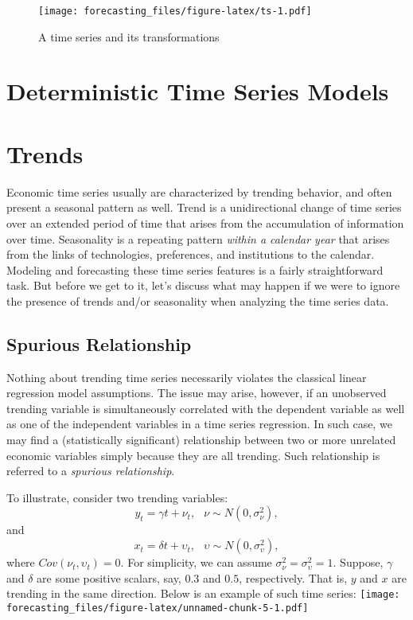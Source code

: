 \documentclass[
  oneside]{book}
\begin{document}
\begin{figure}
\centering
\texttt{[image: forecasting\_files/figure-latex/ts-1.pdf]}
\caption{\label{fig:ts}A time series and its transformations}
\end{figure}

\hypertarget{deterministic-time-series-models}{%
\chapter*{Deterministic Time Series Models}\label{deterministic-time-series-models}}

\hypertarget{trends}{%
\chapter{Trends}\label{trends}}

Economic time series usually are characterized by trending behavior, and often present a seasonal pattern as well. Trend is a unidirectional change of time series over an extended period of time that arises from the accumulation of information over time. Seasonality is a repeating pattern \emph{within a calendar year} that arises from the links of technologies, preferences, and institutions to the calendar. Modeling and forecasting these time series features is a fairly straightforward task. But before we get to it, let's discuss what may happen if we were to ignore the presence of trends and/or seasonality when analyzing the time series data.

\hypertarget{spurious-relationship}{%
\section{Spurious Relationship}\label{spurious-relationship}}

Nothing about trending time series necessarily violates the classical linear regression model assumptions. The issue may arise, however, if an unobserved trending variable is simultaneously correlated with the dependent variable as well as one of the independent variables in a time series regression. In such case, we may find a (statistically significant) relationship between two or more unrelated economic variables simply because they are all trending. Such relationship is referred to a \emph{spurious relationship}.

To illustrate, consider two trending variables: \[y_t = \gamma t + \nu_t,\;~~\nu\sim N(0,\sigma_{\nu}^2),\] and \[x_t = \delta t + \upsilon_t,\;~~\upsilon\sim N(0,\sigma_{\upsilon}^2),\] where \(Cov(\nu_t,\upsilon_t) = 0\). For simplicity, we can assume \(\sigma_{\nu}^2=\sigma_{\upsilon}^2=1\). Suppose, \(\gamma\) and \(\delta\) are some positive scalars, say, \(0.3\) and \(0.5\), respectively. That is, \(y\) and \(x\) are trending in the same direction. Below is an example of such time series:
\texttt{[image: forecasting\_files/figure-latex/unnamed-chunk-5-1.pdf]}
\end{document}
